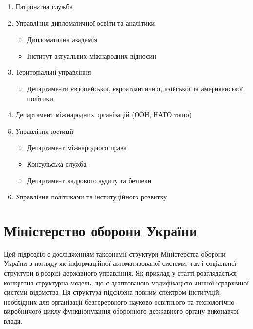 \begin{enumerate}
    \item Патронатна служба
    \item Управління дипломатичної освіти та аналітики
    \begin{itemize}
        \item Дипломатична академія
        \item Інститут актуальних міжнародних відносин
    \end{itemize}
    \item Територіальні управління
    \begin{itemize}
        \item Департаменти європейської, євроатлантичної, азійської та американської політики
    \end{itemize}
    \item Департамент міжнародних організацій (ООН, НАТО тощо)
    \item Управління юстиції
    \begin{itemize}
        \item Департамент міжнародного права
        \item Консульська служба
        \item Департамент кадрового аудиту та безпеки
    \end{itemize}
    \item Управління політиками та інституційного розвитку
\end{enumerate}

\newpage
\section{Міністерство оборони України}

Цей підрозділ є дослідженням таксономії структури Міністерства оборони України з погляду як інформаційної автоматизованої системи, так і соціальної структури в розрізі державного управління. Як приклад у статті розглядається конкретна структурна модель, що є адаптованою модифікацією чинної ієрархічної системи відомства. Ця структура підсилена повним спектром інституцій, необхідних для організації безперервного науково-освітнього та технологічно-виробничого циклу функціонування оборонного державного органу виконавчої влади.

